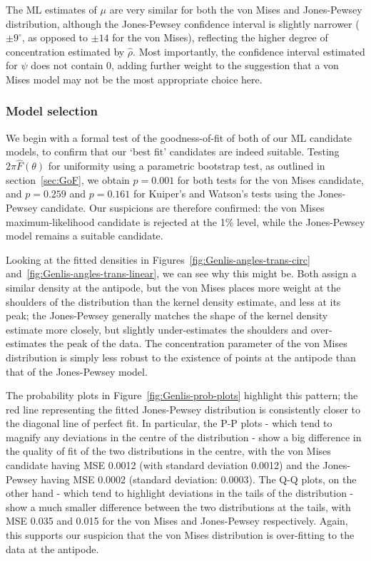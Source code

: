 \documentclass[../../ArchStats.tex]{subfiles}
\begin{document}
The ML estimates of $\mu$ are very similar for both the von Mises and Jones-Pewsey distribution, although the Jones-Pewsey confidence interval is slightly narrower ($\pm 9^\circ$, as opposed to $\pm 14$ for the von Mises), reflecting the higher degree of concentration estimated by $\hat{\rho}$. Most importantly, the confidence interval estimated for $\psi$ does not contain 0, adding further weight to the suggestion that a von Mises model may not be the most appropriate choice here.


\subsubsection{Model selection}
  
We begin with a formal test of the goodness-of-fit of both of our ML candidate models, to confirm that our `best fit'  candidates are indeed suitable. Testing $2\pi \hat{F}({\theta})$ for uniformity using a parametric bootstrap test, as outlined in section~\ref{sec:GoF}, we obtain $p = 0.001$ for both tests for the von Mises candidate, and $p = 0.259$ and $p=0.161$ for Kuiper's and Watson's tests using the Jones-Pewsey candidate. Our suspicions are therefore confirmed: the von Mises maximum-likelihood candidate is rejected at the 1\% level, while the Jones-Pewsey model remains a suitable candidate.

Looking at the fitted densities in Figures~\ref{fig:Genlis-angles-trans-circ} and~\ref{fig:Genlis-angles-trans-linear}, we can see why this might be. Both assign a similar density at the antipode, but the von Mises places more weight at the shoulders of the distribution than the kernel density estimate, and less at its peak; the Jones-Pewsey generally matches the shape of the kernel density estimate more closely, but slightly under-estimates the shoulders and over-estimates the peak of the data. The concentration parameter of the von Mises distribution is simply less robust to the existence of points at the antipode than that of the Jones-Pewsey model.

The probability plots in Figure~\ref{fig:Genlis-prob-plots} highlight this pattern; the red line representing the fitted Jones-Pewsey distribution is consistently closer to the diagonal line of perfect fit. In particular, the P-P plots - which tend to magnify any deviations in the centre of the distribution - show a big difference in the quality of fit of the two distributions in the centre, with the von Mises candidate having MSE 0.0012 (with standard deviation 0.0012) and the Jones-Pewsey having MSE 0.0002 (standard deviation: 0.0003). The Q-Q plots, on the other hand - which tend to highlight deviations in the tails of the distribution - show a much smaller difference between the two distributions at the tails, with MSE 0.035 and 0.015 for the von Mises and Jones-Pewsey respectively. Again, this supports our suspicion that the von Mises distribution is over-fitting to the data at the antipode.
\end{document}
